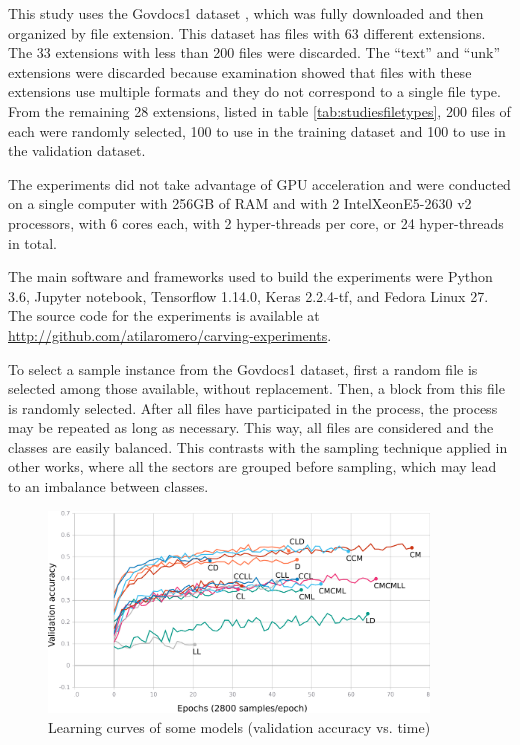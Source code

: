 This study uses the Govdocs1 dataset \cite{garfinkel_bringing_2009}, which was fully downloaded and then organized by file extension. This dataset has files with 63 different extensions. The 33 extensions with less than 200 files were discarded. The  ``text'' and ``unk'' extensions were discarded because examination showed that files with these extensions use multiple formats and they do not correspond to a single file type. From the remaining 28 extensions, listed in table \ref{tab:studiesfiletypes}, 200 files of each were randomly selected, 100 to use in the training dataset and 100 to use in the validation dataset.

% 

The experiments did not take advantage of GPU acceleration and were  conducted on a single computer with 256GB of RAM and with 2 Intel\textregistered Xeon\textregistered E5-2630 v2 processors, with 6 cores each, with 2 hyper-threads per core, or 24 hyper-threads in total. 


The main software and frameworks used to build the experiments were Python 3.6, Jupyter notebook, Tensorflow 1.14.0, Keras 2.2.4-tf, and Fedora Linux 27.
The source code for the experiments is available at \sloppy\url{http://github.com/atilaromero/carving-experiments}.

To select a sample instance from the Govdocs1 dataset, first a random file is selected among those available, without replacement. Then, a block from this file is randomly selected. After all files have participated in the process, the process may be repeated as long as necessary. This way, all files are considered and the classes are easily balanced.
This contrasts with the sampling technique applied in other works, where all the sectors are grouped before sampling, which may lead to an imbalance between classes.
\noindent
\begin{figure}[htb!]
\centering\includegraphics[width=0.9\textwidth]{content/epoch_val_categorical_accuracy.png}
\caption{\label{fig:learning}Learning curves of some models (validation accuracy vs. time)}%
\end{figure}

